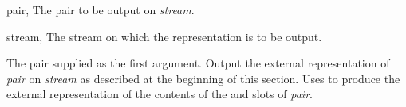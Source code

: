 \begin{optDefinition}
%
\begin{specargs}
    \item[pair, \classref{cons}] The pair to be output on {\em stream}.
    \item[stream, \classref{stream}] The stream on which the representation is
    to be output.
\end{specargs}
%
\result%
The pair supplied as the first argument.
%
\remarks%
Output the external representation of {\em pair\/} on {\em stream\/} as
described at the beginning of this section.  Uses  to
produce the external representation of the contents of the  and
 slots of {\em pair}.

\end{optDefinition}
